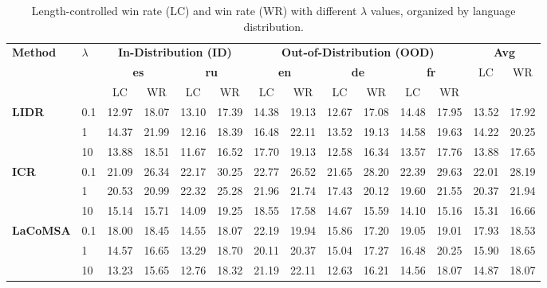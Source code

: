 \begin{table}[t]
\centering
\scriptsize
\setlength{\tabcolsep}{4pt}
\renewcommand{\arraystretch}{1.15}
\begin{tabular}{llcc|cc|cc|cc|cc|cc}
\toprule
\multirow{2}{*}{\textbf{Method}} & \multirow{2}{*}{\textbf{$\lambda$}} & \multicolumn{4}{c|}{\textbf{In-Distribution (ID)}} & \multicolumn{6}{c|}{\textbf{Out-of-Distribution (OOD)}} & \multicolumn{2}{c}{\textbf{Avg}} \\
  &   & \multicolumn{2}{c}{\textbf{es}} & \multicolumn{2}{c|}{\textbf{ru}} & \multicolumn{2}{c}{\textbf{en}} & \multicolumn{2}{c}{\textbf{de}} & \multicolumn{2}{c|}{\textbf{fr}} & LC & WR \\
  &   & LC & WR & LC & WR & LC & WR & LC & WR & LC & WR &  &  \\
\midrule
\multirow{3}{*}{\textbf{LIDR}} & 0.1 & 12.97 & 18.07 & 13.10 & 17.39 & 14.38 & 19.13 & 12.67 & 17.08 & 14.48 & 17.95 & 13.52 & 17.92 \\
 & 1 & 14.37 & 21.99 & 12.16 & 18.39 & 16.48 & 22.11 & 13.52 & 19.13 & 14.58 & 19.63 & 14.22 & 20.25 \\
 & 10 & 13.88 & 18.51 & 11.67 & 16.52 & 17.70 & 19.13 & 12.58 & 16.34 & 13.57 & 17.76 & 13.88 & 17.65 \\
\midrule
\multirow{3}{*}{\textbf{ICR}} & 0.1 & 21.09 & 26.34 & 22.17 & 30.25 & 22.77 & 26.52 & 21.65 & 28.20 & 22.39 & 29.63 & 22.01 & 28.19 \\
 & 1 & 20.53 & 20.99 & 22.32 & 25.28 & 21.96 & 21.74 & 17.43 & 20.12 & 19.60 & 21.55 & 20.37 & 21.94 \\
 & 10 & 15.14 & 15.71 & 14.09 & 19.25 & 18.55 & 17.58 & 14.67 & 15.59 & 14.10 & 15.16 & 15.31 & 16.66 \\
\midrule
\multirow{3}{*}{\textbf{LaCoMSA}} & 0.1 & 18.00 & 18.45 & 14.55 & 18.07 & 22.19 & 19.94 & 15.86 & 17.20 & 19.05 & 19.01 & 17.93 & 18.53 \\
 & 1 & 14.57 & 16.65 & 13.29 & 18.70 & 20.11 & 20.37 & 15.04 & 17.27 & 16.48 & 20.25 & 15.90 & 18.65 \\
 & 10 & 13.23 & 15.65 & 12.76 & 18.32 & 21.19 & 22.11 & 12.63 & 16.21 & 14.56 & 18.07 & 14.87 & 18.07 \\
\bottomrule
\end{tabular}
\caption{Length-controlled win rate (LC) and win rate (WR) with different $\lambda$ values, organized by language distribution.}
\label{tab:w_reinforce_metrics}
\end{table}
